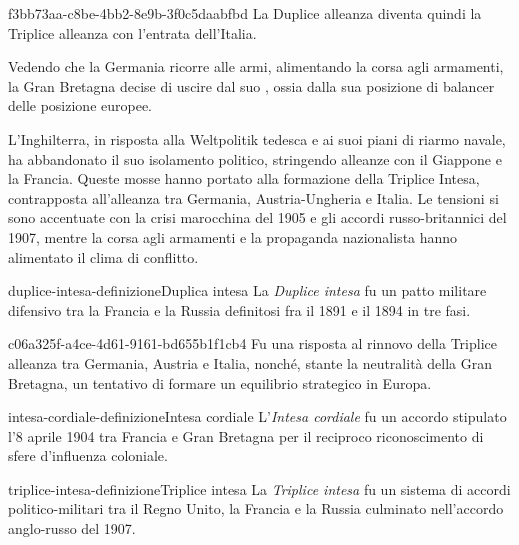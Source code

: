 \documentclass[preview]{standalone}
\begin{document}
\begin{snippet}{f3bb73aa-c8be-4bb2-8e9b-3f0c5daabfbd}
    La Duplice alleanza diventa quindi la Triplice alleanza 
    con l'entrata dell'Italia.
    
    
    Vedendo che la Germania ricorre alle armi, alimentando la corsa agli armamenti, la Gran Bretagna
    decise di uscire dal suo , ossia dalla sua posizione di balancer delle
    posizione europee.
    
    L'Inghilterra, in risposta alla Weltpolitik tedesca e ai suoi
    piani di riarmo navale, ha abbandonato il suo isolamento politico,
    stringendo alleanze con il Giappone e la Francia.
    Queste mosse hanno portato alla formazione della Triplice Intesa,
    contrapposta all'alleanza tra Germania,
    Austria-Ungheria e Italia.
    Le tensioni si sono accentuate con la crisi marocchina del 1905 e
    gli accordi russo-britannici del 1907, mentre la corsa agli armamenti e
    la propaganda nazionalista hanno alimentato il clima di conflitto.
\end{snippet}

\begin{snippetdefinition}{duplice-intesa-definizione}{Duplica intesa}
    La \textit{Duplice intesa}
    fu un patto militare difensivo tra la Francia e la Russia definitosi fra il 1891 e il 1894 in tre fasi.
\end{snippetdefinition}

\begin{snippet}{c06a325f-a4ce-4d61-9161-bd655b1f1cb4}
    Fu una risposta al rinnovo della Triplice alleanza tra Germania,
    Austria e Italia, nonché, stante la neutralità della Gran Bretagna,
    un tentativo di formare un equilibrio strategico in Europa.
\end{snippet}

\begin{snippetdefinition}{intesa-cordiale-definizione}{Intesa cordiale}
    L'\textit{Intesa cordiale}
    fu un accordo stipulato l'8 aprile 1904 tra Francia
    e Gran Bretagna per il reciproco riconoscimento di sfere d'influenza coloniale. 
\end{snippetdefinition}

\begin{snippetdefinition}{triplice-intesa-definizione}{Triplice intesa}
    La \textit{Triplice intesa}
    fu un sistema di accordi politico-militari tra il Regno Unito,
    la Francia e la Russia culminato nell'accordo anglo-russo del 1907.
\end{snippetdefinition}
\end{document}
